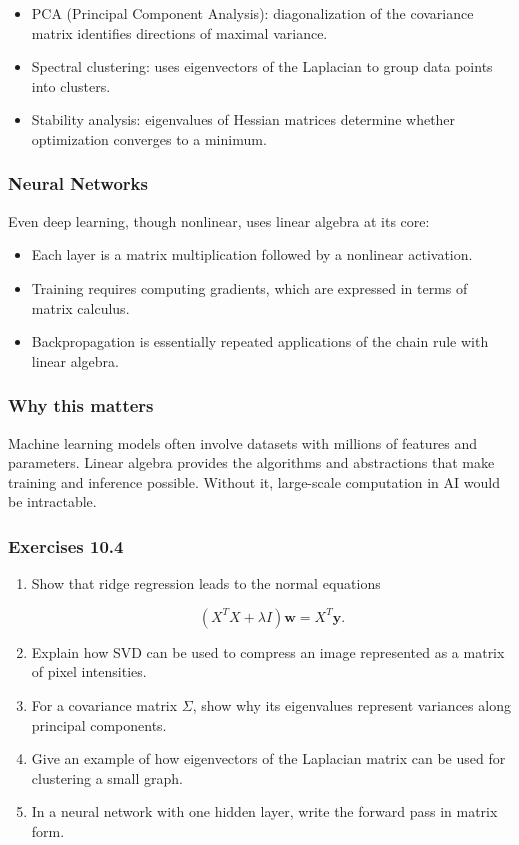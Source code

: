 \documentclass[
  12pt,
  a4paper,
]{article}
\begin{document}
\begin{itemize}
\item
  PCA (Principal Component Analysis): diagonalization of the covariance
  matrix identifies directions of maximal variance.
\item
  Spectral clustering: uses eigenvectors of the Laplacian to group data
  points into clusters.
\item
  Stability analysis: eigenvalues of Hessian matrices determine whether
  optimization converges to a minimum.
\end{itemize}

\subsubsection{Neural Networks}\label{neural-networks}

Even deep learning, though nonlinear, uses linear algebra at its core:

\begin{itemize}
\item
  Each layer is a matrix multiplication followed by a nonlinear
  activation.
\item
  Training requires computing gradients, which are expressed in terms of
  matrix calculus.
\item
  Backpropagation is essentially repeated applications of the chain rule
  with linear algebra.
\end{itemize}

\subsubsection{Why this matters}\label{why-this-matters-39}

Machine learning models often involve datasets with millions of features
and parameters. Linear algebra provides the algorithms and abstractions
that make training and inference possible. Without it, large-scale
computation in AI would be intractable.

\subsubsection{Exercises 10.4}\label{exercises-104}

\begin{enumerate}
\def\labelenumi{\arabic{enumi}.}
\item
  Show that ridge regression leads to the normal equations

  \[(X^T X + \lambda I)\mathbf{w} = X^T \mathbf{y}.\]
\item
  Explain how SVD can be used to compress an image represented as a
  matrix of pixel intensities.
\item
  For a covariance matrix \(\Sigma\), show why its eigenvalues represent
  variances along principal components.
\item
  Give an example of how eigenvectors of the Laplacian matrix can be
  used for clustering a small graph.
\item
  In a neural network with one hidden layer, write the forward pass in
  matrix form.
\end{enumerate}
\end{document}
